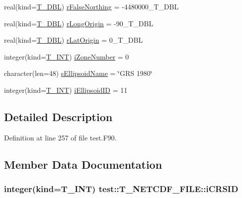 \begin{DoxyCompactItemize}
real(kind=\hyperlink{namespacetest_af379b935264d350d76bf75331181e241}{T\_\-DBL}) \hyperlink{typetest_1_1_t___n_e_t_c_d_f___f_i_l_e_aa4b10c236acf5fc43ac821d9143b4408}{rFalseNorthing} = -\/4480000\_\-T\_\-DBL
\item 
real(kind=\hyperlink{namespacetest_af379b935264d350d76bf75331181e241}{T\_\-DBL}) \hyperlink{typetest_1_1_t___n_e_t_c_d_f___f_i_l_e_a4e39d5abd1833b7d7ff67976dba62637}{rLongOrigin} = -\/90\_\-T\_\-DBL
\item 
real(kind=\hyperlink{namespacetest_af379b935264d350d76bf75331181e241}{T\_\-DBL}) \hyperlink{typetest_1_1_t___n_e_t_c_d_f___f_i_l_e_a4f81c48c7e0b4f2f125a6f623fc34c51}{rLatOrigin} = 0\_\-T\_\-DBL
\item 
integer(kind=\hyperlink{namespacetest_a6f91ebd89b58cfcc5da99faed9385c1e}{T\_\-INT}) \hyperlink{typetest_1_1_t___n_e_t_c_d_f___f_i_l_e_ad7bf8dac2263d91cbf76a6c022f38df5}{iZoneNumber} = 0
\item 
character(len=48) \hyperlink{typetest_1_1_t___n_e_t_c_d_f___f_i_l_e_a130a9d42f981cfc37b0b4d44c37e1786}{sEllipsoidName} = \char`\"{}GRS 1980\char`\"{}
\item 
integer(kind=\hyperlink{namespacetest_a6f91ebd89b58cfcc5da99faed9385c1e}{T\_\-INT}) \hyperlink{typetest_1_1_t___n_e_t_c_d_f___f_i_l_e_ab8d0a2ec68bd04229fdf7b2768c896c1}{iEllipsoidID} = 11
\end{DoxyCompactItemize}


\subsection{Detailed Description}


Definition at line 257 of file test.F90.



\subsection{Member Data Documentation}
\hypertarget{typetest_1_1_t___n_e_t_c_d_f___f_i_l_e_ad623d77a383c8c944b83b310a382e593}{
\subsubsection[{iCRSID}]{\setlength{\rightskip}{0pt plus 5cm}integer(kind={\bf T\_\-INT}) {\bf test::T\_\-NETCDF\_\-FILE::iCRSID}}}
\label{typetest_1_1_t___n_e_t_c_d_f___f_i_l_e_ad623d77a383c8c944b83b310a382e593}



